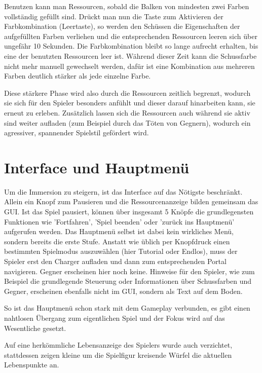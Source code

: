 Benutzen kann man Ressourcen, sobald die Balken von mindesten zwei Farben vollständig gefüllt sind. Drückt man nun die Taste zum Aktivieren der Farbkombination (Leertaste), so werden den Schüssen die Eigenschaften der aufgefüllten Farben verliehen und die entsprechenden Ressourcen leeren sich über ungefähr 10 Sekunden. Die Farbkombination bleibt so lange aufrecht erhalten, bis eine der benutzten Ressourcen leer ist. Während dieser Zeit kann die Schussfarbe nicht mehr manuell gewechselt werden, dafür ist eine Kombination aus mehreren Farben deutlich stärker als jede einzelne Farbe.

Diese stärkere Phase wird also durch die Ressourcen zeitlich begrenzt, wodurch sie sich für den Spieler besonders anfühlt und dieser darauf hinarbeiten kann, sie erneut zu erleben. Zusätzlich lassen sich die Ressourcen auch während sie aktiv sind weiter aufladen (zum Beispiel durch das Töten von Gegnern), wodurch ein agressiver, spannender Spielstil gefördert wird.



\section{Interface und Hauptmenü}

Um die Immersion zu steigern, ist das Interface auf das Nötigste beschränkt. Allein ein Knopf zum Pausieren und die Ressourcenanzeige bilden gemeinsam das GUI. Ist das Spiel pausiert, können über insgesamt 5 Knöpfe die grundlegensten Funktionen wie 'Fortfahren', 'Spiel beenden' oder 'zurück ins Hauptmenü'  aufgerufen werden. 
Das Hauptmenü selbst ist dabei kein wirkliches Menü, sondern bereits die erste Stufe. Anstatt wie üblich per Knopfdruck einen bestimmten Spielmodus auszuwählen (hier Tutorial oder Endlos), muss der Spieler erst den Charger aufladen und dann zum entsprechenden Portal navigieren. Gegner erscheinen hier noch keine. Hinweise für den Spieler, wie zum Beispiel die grundlegende Steuerung oder Informationen über Schussfarben und Gegner, erscheinen ebenfalls nicht im GUI, sondern als Text auf dem Boden. 

So ist das Hauptmenü schon stark mit dem Gameplay verbunden, es gibt einen nahtlosen Übergang zum eigentlichen Spiel und der Fokus wird auf das Wesentliche gesetzt.

Auf eine herkömmliche Lebensanzeige des Spielers wurde auch verzichtet, stattdessen zeigen kleine um die Spielfigur kreisende Würfel die aktuellen Lebenspunkte an.



